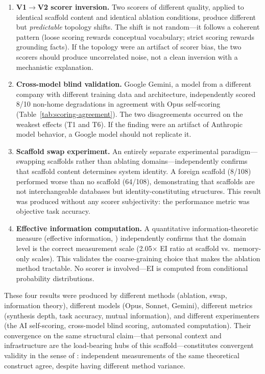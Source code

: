 \documentclass[12pt,letterpaper]{article}
\begin{document}
\begin{enumerate}[nosep]
  \item \textbf{V1$\to$V2 scorer inversion.} Two scorers of different quality, applied to identical scaffold content and identical ablation conditions, produce different but \emph{predictable} topology shifts. The shift is not random---it follows a coherent pattern (loose scoring rewards conceptual vocabulary; strict scoring rewards grounding facts). If the topology were an artifact of scorer bias, the two scorers should produce uncorrelated noise, not a clean inversion with a mechanistic explanation.

  \item \textbf{Cross-model blind validation.} Google Gemini, a model from a different company with different training data and architecture, independently scored 8/10 non-home degradations in agreement with Opus self-scoring (Table~\ref{tab:scoring-agreement}). The two disagreements occurred on the weakest effects (T1 and T6). If the finding were an artifact of Anthropic model behavior, a Google model should not replicate it.

  \item \textbf{Scaffold swap experiment.} An entirely separate experimental paradigm---swapping scaffolds rather than ablating domains---independently confirms that scaffold content determines system identity. A foreign scaffold (8/108) performed worse than no scaffold (64/108), demonstrating that scaffolds are not interchangeable databases but identity-constituting structures. This result was produced without any scorer subjectivity: the performance metric was objective task accuracy.

  \item \textbf{Effective information computation.} A quantitative information-theoretic measure (effective information, \citealt{hoel2017map}) independently confirms that the domain level is the correct measurement scale (2.05$\times$ EI ratio at scaffold vs.\ memory-only scales). This validates the coarse-graining choice that makes the ablation method tractable. No scorer is involved---EI is computed from conditional probability distributions.
\end{enumerate}

These four results were produced by different methods (ablation, swap, information theory), different models (Opus, Sonnet, Gemini), different metrics (synthesis depth, task accuracy, mutual information), and different experimenters (the AI self-scoring, cross-model blind scoring, automated computation). Their convergence on the same structural claim---that personal context and infrastructure are the load-bearing hubs of this scaffold---constitutes convergent validity in the sense of \citet{campbell1959convergent}: independent measurements of the same theoretical construct agree, despite having different method variance.
\end{document}
